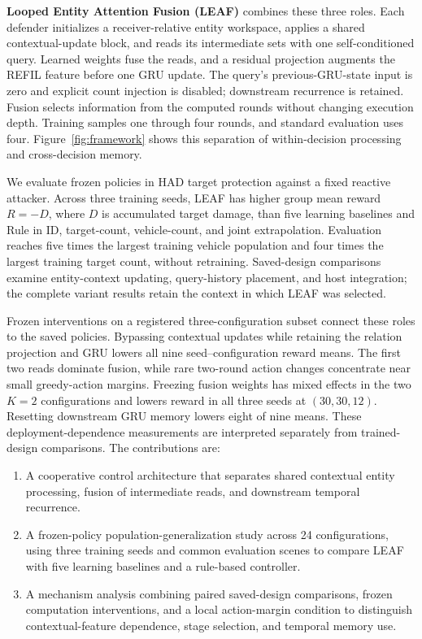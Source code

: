 \textbf{Looped Entity Attention Fusion (LEAF)} combines these three roles. Each defender initializes a receiver-relative entity workspace, applies a shared contextual-update block, and reads its intermediate sets with one self-conditioned query. Learned weights fuse the reads, and a residual projection augments the REFIL feature before one GRU update. The query's previous-GRU-state input is zero and explicit count injection is disabled; downstream recurrence is retained. Fusion selects information from the computed rounds without changing execution depth. Training samples one through four rounds, and standard evaluation uses four. Figure~\ref{fig:framework} shows this separation of within-decision processing and cross-decision memory.

We evaluate frozen policies in HAD target protection against a fixed reactive attacker. Across three training seeds, LEAF has higher group mean reward $R=-D$, where $D$ is accumulated target damage, than five learning baselines and Rule in ID, target-count, vehicle-count, and joint extrapolation. Evaluation reaches five times the largest training vehicle population and four times the largest training target count, without retraining. Saved-design comparisons examine entity-context updating, query-history placement, and host integration; the complete variant results retain the context in which LEAF was selected.

Frozen interventions on a registered three-configuration subset connect these roles to the saved policies. Bypassing contextual updates while retaining the relation projection and GRU lowers all nine seed--configuration reward means. The first two reads dominate fusion, while rare two-round action changes concentrate near small greedy-action margins. Freezing fusion weights has mixed effects in the two $K=2$ configurations and lowers reward in all three seeds at $(30,30,12)$. Resetting downstream GRU memory lowers eight of nine means. These deployment-dependence measurements are interpreted separately from trained-design comparisons. The contributions are:
\begin{enumerate}
\item A cooperative control architecture that separates shared contextual entity processing, fusion of intermediate reads, and downstream temporal recurrence.
\item A frozen-policy population-generalization study across 24 configurations, using three training seeds and common evaluation scenes to compare LEAF with five learning baselines and a rule-based controller.
\item A mechanism analysis combining paired saved-design comparisons, frozen computation interventions, and a local action-margin condition to distinguish contextual-feature dependence, stage selection, and temporal memory use.
\end{enumerate}
